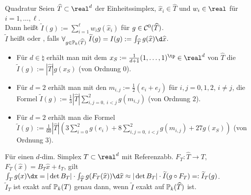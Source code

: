 \begin{Def}{Quadratur}
    Seien $\widehat{T} \subset \real^d$ der Einheitssimplex,
    $\widehat{x}_i \in \widehat{T}$ und $w_i \in \real$ für $i = 1, \dotsc, \ell$.\\
    Dann heißt $\widetilde{I}(g) := \sum_{i=1}^\ell w_i g(\widehat{x}_i)$
     für $g \in \mathcal{C}^0(\widehat{T})$.\\
    $\widetilde{I}$ heißt  oder
    , falls $\forall_{g \in \PP_k(\widehat{T})}\;
    \widetilde{I}(g) = I(g) := \int_{\widehat{T}} g(\widehat{x})\d\widehat{x}$.
\end{Def}

\begin{Bsp}
    \begin{itemize}
        \item
        Für $d \in \natural$ erhält man mit dem 
        $x_S := \frac{1}{d+1} (1, \dotsc, 1)^\tp \in \real^d$ von $\widehat{T}$
        die  $\widetilde{I}(g) := |\widehat{T}| g(x_S)$
        (von Ordnung $0$).

        \item
        Für $d = 2$ erhält man mit den 
        $m_{i,j} := \frac{1}{2} (e_i + e_j)$ für $i, j = 0, 1, 2$, $i \not= j$,
        die Formel
        $\widetilde{I}(g) := \frac{1}{3} |\widehat{T}| \sum_{i,j=0,\; i<j}^2 g(m_{i,j})$
        (von Ordnung $2$).

        \item
        Für $d = 2$ erhält man die Formel\\
        $\widetilde{I}(g) := \frac{1}{60} |\widehat{T}|
        (3 \sum_{i=0}^2 g(e_i) + 8 \sum_{i,j=0,\; i<j}^2 g(m_{i,j}) + 27 g(x_S))$
        (von Ordnung $3$).
    \end{itemize}
\end{Bsp}

\linie

\begin{Bem}
    Für einen $d$-dim. Simplex $T \subset \real^d$ mit Referenzabb.
    $F_T\colon \widehat{T} \to T$, $F_T(\widehat{x}) = B_T \widehat{x} + t_T$, gilt
    $\int_T g(x)\dx = |\det B_T| \cdot \int_{\widehat{T}} g(F_T(\widehat{x})) \d\widehat{x}
    \approx |\det B_T| \cdot \widetilde{I}(g \circ F_T) =: \widetilde{I}_T(g)$.\\
    $\widetilde{I}_T$ ist exakt auf $\mathbb{P}_k(T)$ genau dann,
    wenn $\widetilde{I}$ exakt auf $\mathbb{P}_k(\widehat{T})$ ist.
\end{Bem}


